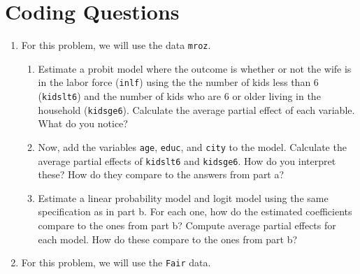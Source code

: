 \documentclass[
  letterpaper,
  DIV=11,
  numbers=noendperiod]{scrreprt}
\begin{document}
\section{Coding Questions}\label{coding-questions-3}

\begin{enumerate}
\def\labelenumi{\arabic{enumi}.}
\item
  For this problem, we will use the data \texttt{mroz}.

  \begin{enumerate}
  \def\labelenumii{\alph{enumii})}
  \item
    Estimate a probit model where the outcome is whether or not the wife
    is in the labor force (\texttt{inlf}) using the the number of kids
    less than 6 (\texttt{kidslt6}) and the number of kids who are 6 or
    older living in the household (\texttt{kidsge6}). Calculate the
    average partial effect of each variable. What do you notice?
  \item
    Now, add the variables \texttt{age}, \texttt{educ}, and
    \texttt{city} to the model. Calculate the average partial effects of
    \texttt{kidslt6} and \texttt{kidsge6}. How do you interpret these?
    How do they compare to the answers from part a?
  \item
    Estimate a linear probability model and logit model using the same
    specification as in part b. For each one, how do the estimated
    coefficients compare to the ones from part b? Compute average
    partial effects for each model. How do these compare to the ones
    from part b?
  \end{enumerate}
\item
  For this problem, we will use the \texttt{Fair} data.


\end{enumerate}
\end{document}
